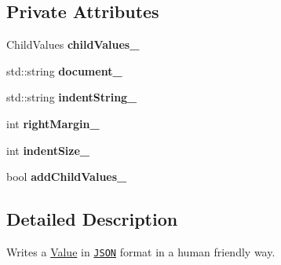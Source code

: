 \subsection*{Private Attributes}
\begin{DoxyCompactItemize}
\item 
\hypertarget{class_json_1_1_styled_writer_a1f905495f0705365af117ec541e29fdf}{}Child\+Values {\bfseries child\+Values\+\_\+}\label{class_json_1_1_styled_writer_a1f905495f0705365af117ec541e29fdf}

\item 
\hypertarget{class_json_1_1_styled_writer_ac092c93313e7ab202b13e075d682faea}{}std\+::string {\bfseries document\+\_\+}\label{class_json_1_1_styled_writer_ac092c93313e7ab202b13e075d682faea}

\item 
\hypertarget{class_json_1_1_styled_writer_a98a33f1d4c853a4dbf87ca17499c5830}{}std\+::string {\bfseries indent\+String\+\_\+}\label{class_json_1_1_styled_writer_a98a33f1d4c853a4dbf87ca17499c5830}

\item 
\hypertarget{class_json_1_1_styled_writer_a9c8fc62cb4f3b4a6dbed470fea2aa567}{}int {\bfseries right\+Margin\+\_\+}\label{class_json_1_1_styled_writer_a9c8fc62cb4f3b4a6dbed470fea2aa567}

\item 
\hypertarget{class_json_1_1_styled_writer_ae911f06042935286c24a9fb23dba78bd}{}int {\bfseries indent\+Size\+\_\+}\label{class_json_1_1_styled_writer_ae911f06042935286c24a9fb23dba78bd}

\item 
\hypertarget{class_json_1_1_styled_writer_acaabfa48b50a8bb7fa9ce98e2ae971d9}{}bool {\bfseries add\+Child\+Values\+\_\+}\label{class_json_1_1_styled_writer_acaabfa48b50a8bb7fa9ce98e2ae971d9}

\end{DoxyCompactItemize}


\subsection{Detailed Description}
Writes a \hyperlink{class_json_1_1_value}{Value} in \href{http://www.json.org}{\tt J\+S\+O\+N} format in a human friendly way. 

